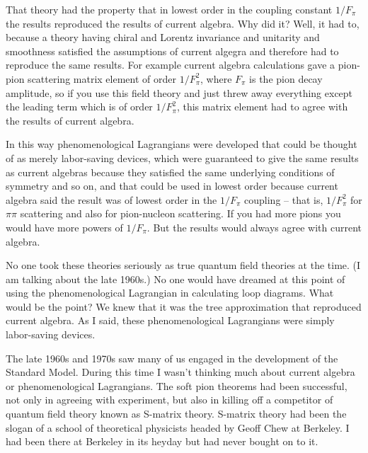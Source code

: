That theory had the property that in lowest order in the coupling constant $1/F_\pi$ the results reproduced the results of current algebra.  Why did it? Well, it had to, because a theory having  chiral and Lorentz invariance and  unitarity and smoothness satisfied the assumptions of current algegra and therefore had to reproduce the same results.  For example  current algebra calculations gave a pion-pion scattering  matrix element of order $1/F_\pi^2$, where $F_\pi$ is the pion decay amplitude, so if you use this field theory and just threw away everything except the leading term which is of order  $1/F_\pi^2$, this matrix element had to agree with the results of current algebra. 

In this way phenomenological Lagrangians were developed that could be thought of as merely labor-saving devices, which were guaranteed to give the same results as current algebras because they satisfied the same underlying conditions of symmetry and so on, and that could be used in lowest order because current algebra said the result was of lowest order in  the $1/F_\pi$ coupling -- that is, $1/F_\pi^2$ for $\pi\pi$ scattering and also for pion-nucleon scattering. If you had more pions you would have more powers of $1/F_\pi$. But the results would always agree with current algebra.

No one took these theories seriously  as true quantum field theories at the time. (I am talking about the late 1960s.)  No one would have dreamed at this point of using the phenomenological Lagrangian in calculating loop diagrams. What would be the point? We knew that it was the tree approximation that reproduced current algebra. As I said, these phenomenological Lagrangians were simply labor-saving devices. 

The late 1960s and 1970s saw many of us engaged in the development of the Standard Model. During this time I wasn't thinking much about current algebra or phenomenological Lagrangians. The soft pion theorems had been successful,  not only in agreeing with experiment, but also in killing off a competitor of quantum field theory known as S-matrix theory. S-matrix theory had been the slogan of a school of theoretical physicists headed by Geoff Chew at Berkeley. I had been there at Berkeley in its heyday but had never bought on to it. 

